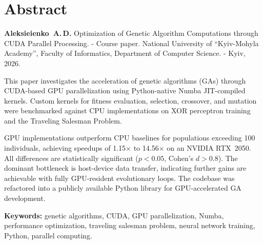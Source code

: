 \documentclass[14pt,a4paper]{extarticle}
\begin{document}
\section*{Abstract}

\textbf{Aleksieienko~A.\,D.} Optimization of Genetic Algorithm Computations through CUDA Parallel Processing. - Course paper. National University of ``Kyiv-Mohyla Academy'', Faculty of Informatics, Department of Computer Science. - Kyiv, 2026.

\bigskip
This paper investigates the acceleration of genetic algorithms (GAs) through CUDA-based GPU parallelization using Python-native Numba JIT-compiled kernels. Custom kernels for fitness evaluation, selection, crossover, and mutation were benchmarked against CPU implementations on XOR perceptron training and the Traveling Salesman Problem.

GPU implementations outperform CPU baselines for populations exceeding 100 individuals, achieving speedups of 1.15$\times$ to 14.56$\times$ on an NVIDIA RTX~2050. All differences are statistically significant ($p < 0.05$, Cohen's $d > 0.8$). The dominant bottleneck is host-device data transfer, indicating further gains are achievable with fully GPU-resident evolutionary loops. The codebase was refactored into a publicly available Python library for GPU-accelerated GA development.

\bigskip
\textbf{Keywords:} genetic algorithms, CUDA, GPU parallelization, Numba, performance optimization, traveling salesman problem, neural network training, Python, parallel computing.
\end{document}
